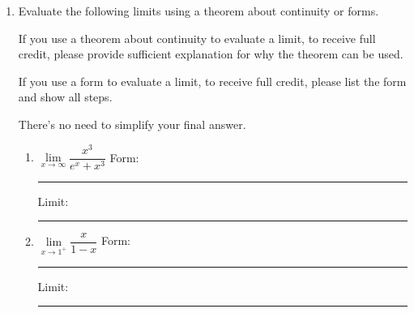 \documentclass[11pt]{article}
\begin{document}
\begin{enumerate}
\begin{enumerate}
\begin{enumerate}
        \item[(ii)] $\log_{2}(\sqrt[3]{2^4})$

        \vfill
    \end{enumerate}

    \item Solve the following equation for $x$. 

    \[\log_{3}(5x - 1)=2\]

    \vfill
\end{enumerate}


\newpage


\item Evaluate the following limits using a theorem about continuity or forms.

If you use a theorem about continuity to evaluate a limit, to receive full credit, please provide sufficient explanation for why the theorem can be used. 

If you use a form to evaluate a limit, to receive full credit, please list the form and show all steps. 

There's no need to simplify your final answer.
\vspace{1.5cm}
\begin{enumerate}
    \item $\lim\limits_{x\to\infty}\dfrac{x^3}{e^x + x^3}$ %
\hfill Form: \rule[-8pt]{2in}{0.4pt} \quad Limit: \rule[-8pt]{2in}{0.4pt}
    \vfill

    \item $\lim\limits_{x\to 1^+}\dfrac{x}{1-x}$
\hfill Form: \rule[-8pt]{2in}{0.4pt} \quad Limit: \rule[-8pt]{2in}{0.4pt}

    \vfill
\end{enumerate}


\newpage


\end{enumerate}
\end{document}
